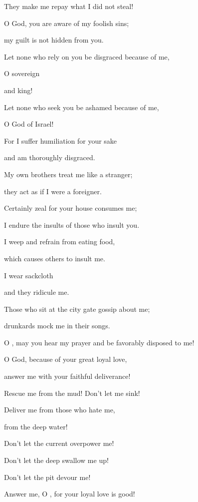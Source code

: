 {\par }{\Q They make me repay
what
I did not
steal!
\par }{\Q {}O God,
you
are aware
of my foolish
sins;

\par }{\Q my guilt
is not
hidden from you.
\par }{\Q {}Let
none who rely
on you be disgraced
because of me,
\par }{\Q O sovereign

{}
and king!

\par }{\Q Let
none
who seek
you be ashamed
because of me,
\par }{\Q O God
of Israel!
\par }{\Q {}For
I suffer
humiliation
for your sake

\par }{\Q and am thoroughly
disgraced.
\par }{\Q {}My own brothers
treat
me like a stranger;
\par }{\Q they act as if I were a foreigner.
\par }{\Q {}Certainly
zeal
for your house
consumes
me;
\par }{\Q I endure the insults
of those who insult you.
\par }{\Q {}I weep
and refrain from eating food,
\par }{\Q which causes
others to insult me.
\par }{\Q {}I
wear
sackcloth
\par }{\Q and they
ridicule me.
\par }{\Q {}Those
who sit
at the city gate
gossip about me;
\par }{\Q drunkards
mock me in their songs.
\par }{\Q {}O
{}, may you hear my
prayer
and be favorably
disposed to me!

\par }{\Q O God,
because of your great
loyal love,
\par }{\Q answer
me with your faithful
deliverance!
\par }{\Q {}Rescue
me from the mud! Don’t
let me sink!
\par }{\Q Deliver
me from those who hate
me,
\par }{\Q from the deep
water!
\par }{\Q {}Don’t
let the current
overpower
me!
\par }{\Q Don’t
let the deep
swallow
me up!
\par }{\Q Don’t
let the pit
devour me!
\par }{\Q {}Answer
me, O
{}, for
your loyal love
is good!

}
